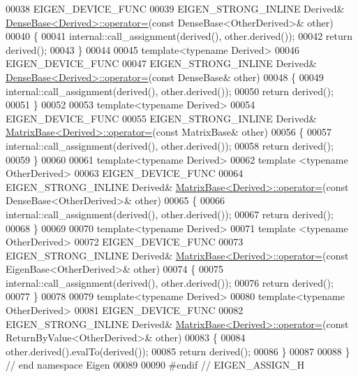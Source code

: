 \begin{DoxyCode}
00038 EIGEN\_DEVICE\_FUNC
00039 EIGEN\_STRONG\_INLINE Derived& \hyperlink{group___core___module_a581a7a353bd007b5352f11688e3bc5fa}{DenseBase<Derived>::operator=}(\textcolor{keyword}{const} 
      DenseBase<OtherDerived>& other)
00040 \{
00041   internal::call\_assignment(derived(), other.derived());
00042   \textcolor{keywordflow}{return} derived();
00043 \}
00044 
00045 \textcolor{keyword}{template}<\textcolor{keyword}{typename} Derived>
00046 EIGEN\_DEVICE\_FUNC
00047 EIGEN\_STRONG\_INLINE Derived& \hyperlink{group___core___module_a581a7a353bd007b5352f11688e3bc5fa}{DenseBase<Derived>::operator=}(\textcolor{keyword}{const} DenseBase& 
      other)
00048 \{
00049   internal::call\_assignment(derived(), other.derived());
00050   \textcolor{keywordflow}{return} derived();
00051 \}
00052 
00053 \textcolor{keyword}{template}<\textcolor{keyword}{typename} Derived>
00054 EIGEN\_DEVICE\_FUNC
00055 EIGEN\_STRONG\_INLINE Derived& \hyperlink{group___core___module_a706a4dd1ee54786e9210de1a4bf02600}{MatrixBase<Derived>::operator=}(\textcolor{keyword}{const} MatrixBase&
       other)
00056 \{
00057   internal::call\_assignment(derived(), other.derived());
00058   \textcolor{keywordflow}{return} derived();
00059 \}
00060 
00061 \textcolor{keyword}{template}<\textcolor{keyword}{typename} Derived>
00062 \textcolor{keyword}{template} <\textcolor{keyword}{typename} OtherDerived>
00063 EIGEN\_DEVICE\_FUNC
00064 EIGEN\_STRONG\_INLINE Derived& \hyperlink{group___core___module_a706a4dd1ee54786e9210de1a4bf02600}{MatrixBase<Derived>::operator=}(\textcolor{keyword}{const} 
      DenseBase<OtherDerived>& other)
00065 \{
00066   internal::call\_assignment(derived(), other.derived());
00067   \textcolor{keywordflow}{return} derived();
00068 \}
00069 
00070 \textcolor{keyword}{template}<\textcolor{keyword}{typename} Derived>
00071 \textcolor{keyword}{template} <\textcolor{keyword}{typename} OtherDerived>
00072 EIGEN\_DEVICE\_FUNC
00073 EIGEN\_STRONG\_INLINE Derived& \hyperlink{group___core___module_a706a4dd1ee54786e9210de1a4bf02600}{MatrixBase<Derived>::operator=}(\textcolor{keyword}{const} 
      EigenBase<OtherDerived>& other)
00074 \{
00075   internal::call\_assignment(derived(), other.derived());
00076   \textcolor{keywordflow}{return} derived();
00077 \}
00078 
00079 \textcolor{keyword}{template}<\textcolor{keyword}{typename} Derived>
00080 \textcolor{keyword}{template}<\textcolor{keyword}{typename} OtherDerived>
00081 EIGEN\_DEVICE\_FUNC
00082 EIGEN\_STRONG\_INLINE Derived& \hyperlink{group___core___module_a706a4dd1ee54786e9210de1a4bf02600}{MatrixBase<Derived>::operator=}(\textcolor{keyword}{const} 
      ReturnByValue<OtherDerived>& other)
00083 \{
00084   other.derived().evalTo(derived());
00085   \textcolor{keywordflow}{return} derived();
00086 \}
00087 
00088 \} \textcolor{comment}{// end namespace Eigen}
00089 
00090 \textcolor{preprocessor}{#endif // EIGEN\_ASSIGN\_H}
\end{DoxyCode}
